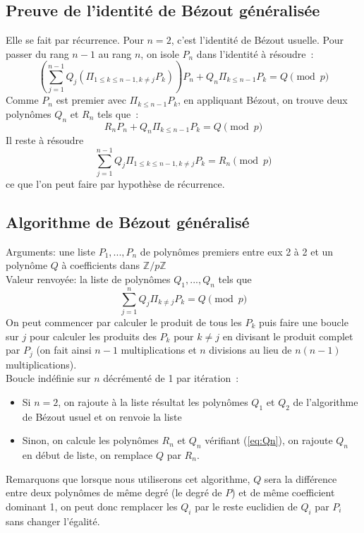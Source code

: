 \documentclass[a4paper,11pt]{article}
\newcommand{\Z}{{\mathbb{Z}}}
\begin{document}
\begin{giacjshere}
\subsection{Preuve de l'identité de Bézout généralisée}
Elle se fait par récurrence. Pour $n=2$, c'est l'identité de Bézout usuelle. 
Pour passer
du rang $n-1$ au rang $n$, on isole $P_n$ dans l'identité à résoudre~:
\[ \left( 
\sum_{j=1}^{n-1} Q_j (\Pi_{1 \leq k \leq n-1,k\neq j} P_k) \right) P_n + 
Q_n \Pi_{k\leq n-1} P_k =Q \pmod p\]
Comme $P_n$ est premier avec $\Pi_{k\leq n-1} P_k$, en appliquant Bézout,
on trouve deux polynômes $Q_n$ et $R_n$ tels que~:
\begin{equation} \label{eq:Qn}
 R_n P_n + Q_n \Pi_{k\leq n-1} P_k =Q \pmod p 
\end{equation}
Il reste à résoudre
\[ \sum_{j=1}^{n-1} Q_j \Pi_{1 \leq k \leq n-1,k\neq j} P_k=R_n \pmod p\]
ce que l'on peut faire par hypothèse de récurrence.

\subsection{Algorithme de Bézout généralisé}
Arguments: une liste $P_1,...,P_n$ de polynômes premiers entre eux 2 à 2  
et un polynôme $Q$ à coefficients dans $\Z/p\Z$\\
Valeur renvoyée: la liste de polynômes $Q_1,...,Q_n$ tels que
\[ \sum_{j=1}^n Q_j \Pi_{k\neq j} P_k=Q \pmod p \]
On peut commencer par calculer le produit de tous les $P_k$ puis faire une 
boucle sur $j$ pour calculer les produits des $P_k$ pour $k\neq j$ en divisant
le produit complet par $P_j$ (on fait ainsi $n-1$ multiplications et
$n$ divisions au lieu de $n(n-1)$ multiplications).\\
Boucle indéfinie sur $n$ décrémenté de 1 par itération~:
\begin{itemize}
\item Si $n=2$, on rajoute à la liste résultat les polynômes 
$Q_1$ et $Q_2$ de l'algorithme de Bézout usuel et on renvoie la liste
\item Sinon, on calcule les polynômes $R_n$ et $Q_n$ vérifiant (\ref{eq:Qn}),
on rajoute $Q_n$ en début de liste, on remplace $Q$ par $R_n$.
\end{itemize}
Remarquons que lorsque nous utiliserons cet algorithme, $Q$ sera la différence
entre deux polynômes de même degré (le degré de $P$) et de même coefficient
dominant 1, on peut donc
remplacer les $Q_i$ par le reste euclidien de $Q_i$ par $P_i$ sans
changer l'égalité.



\end{giacjshere}
\end{document}
